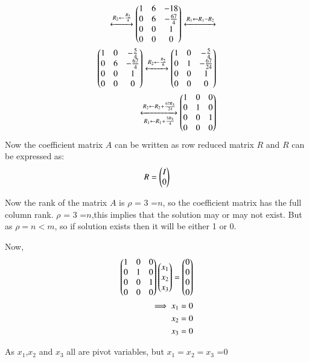 \documentclass[journal,12pt,twocolumn]{IEEEtran}
\renewcommand\thesection{\arabic{section}}
\begin{document}
\begin{align}
\xleftrightarrow[]{R_2\leftarrow \frac{R_2}{4}}
\begin{pmatrix}1 & 6 & -18\\0 & 6 & -\frac{67}{4}\\0 & 0 & 1\\0 & 0 & 0\end{pmatrix}\xleftrightarrow[]{R_1\leftarrow R_1-R_2}\\
\begin{pmatrix}1 & 0 & -\frac{5}{4}\\0 & 6 & -\frac{67}{4}\\0 & 0 & 1\\0 & 0 & 0\end{pmatrix}\xleftrightarrow[]{R_2\leftarrow \frac{R_2}{6}}
\begin{pmatrix}1 & 0 & -\frac{5}{4}\\0 & 1 & -\frac{67}{24}\\0 & 0 & 1\\0 & 0 & 0\end{pmatrix}\\
\xleftrightarrow[R_1\leftarrow R_1+\frac{5R_3}{4}]{R_2\leftarrow R_2+\frac{67R_3}{24}}
\begin{pmatrix}1 & 0 & 0\\0 & 1 & 0\\0 & 0 & 1\\0 & 0 & 0\end{pmatrix}
\end{align}
Now the coefficient matrix $A$ can be written as row reduced matrix $R$ and $R$ can be expressed as:
\begin{align}
R = \begin{pmatrix}I\\0\end{pmatrix}
\end{align}

Now the rank of the matrix $A$ is $\rho$ = 3 =$n$, so the coefficient matrix has the full column rank. $\rho$ = 3 =$n$,this implies that the solution may or may not exist. But as $\rho = n < m$, so if solution exists then it will be either 1 or 0.

Now,
\begin{align}
\begin{pmatrix}1 & 0 & 0\\0 & 1 & 0\\0 & 0 & 1\\0 & 0 & 0\end{pmatrix} \begin{pmatrix}x_1\\x_2\\x_3\end{pmatrix} = \begin{pmatrix}0\\0\\0\\0\end{pmatrix}\\
\implies x_1 = 0\\
x_2 = 0\\
x_3=0\\
\end{align}

As $x_1$,$x_2$ and $x_3$ all are pivot variables, but $x_1 = x_2 = x_3$ =0
\end{document}
